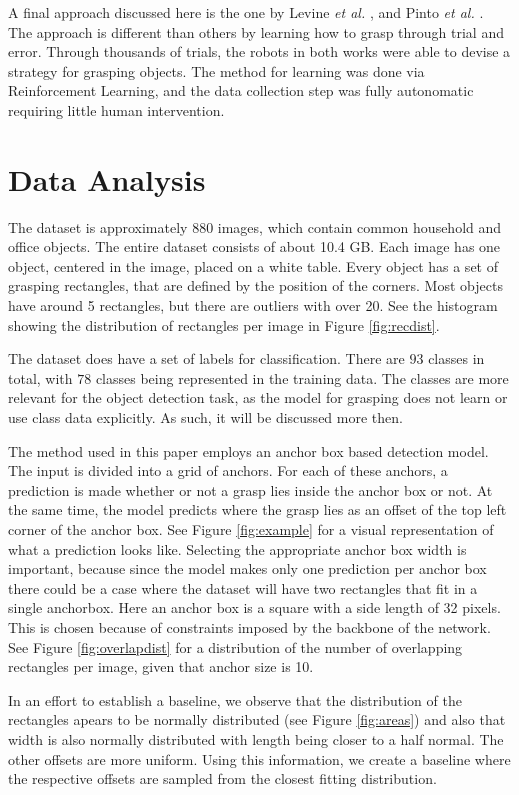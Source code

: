 \documentclass{article}
\begin{document}
A final approach discussed here is the one by Levine \textit{et al.} \cite{levine2018},
and Pinto \textit{et al.} \cite{pinto2016}. The approach is different than others by
learning how to grasp through trial and error. Through thousands of trials, the
robots in both works were able to devise a strategy for grasping objects. The method
for learning was done via Reinforcement Learning, and the data collection step was
fully autonomatic requiring little human intervention.

\newpage
\section{Data Analysis}
The dataset is approximately 880 images, which contain common
household and office objects. The entire dataset consists of about 10.4 GB.
Each image has one object, centered in the image, placed on a white table.
Every object has a set of grasping rectangles, that are defined by the position
of the corners. Most objects have around 5 rectangles, but there are outliers
with over 20. See the histogram showing the distribution of rectangles per image
in Figure \ref{fig:recdist}.

The dataset does have a set of labels for classification.
There are $93$ classes in total, with $78$ classes being represented in the
training data.
The classes are more relevant for the object detection task, as the model for
grasping does not learn or use class data explicitly. As such, it will be discussed
more then.

The method used in this paper employs an anchor box
based detection model. The input is divided into a grid of anchors. For each of
these anchors, a prediction is made whether or not a grasp lies inside the
anchor box or not. At the same time, the model predicts where the grasp lies
as an offset of the top left corner of the anchor box. See Figure \ref{fig:example}
for a visual representation of what a prediction looks like.
Selecting the appropriate anchor box width is important, because
since the model makes only one prediction per anchor box there could
be a case where the dataset will have two rectangles that fit in a single
anchorbox.
Here an anchor box is a square with a side length of 32 pixels. This
is chosen because of constraints imposed by the backbone of the network.
See Figure \ref{fig:overlapdist} for a distribution of the number
of overlapping rectangles per image, given that anchor size is 10.

In an effort to establish a baseline, we observe that the distribution of
the rectangles apears to be normally distributed (see Figure \ref{fig:areas})
and also that width is also normally distributed with length being closer
to a half normal. The other offsets are more uniform. Using this information,
we create a baseline where the respective offsets are sampled from the closest
fitting distribution.
\end{document}
